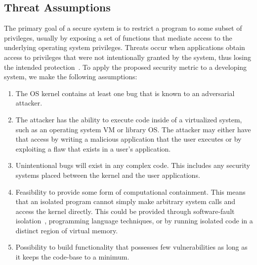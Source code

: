 
\subsection{Threat Assumptions}

The primary goal of a secure system is to restrict a program to some subset
of privileges, 
usually by exposing a set of functions that mediate access to the
underlying operating system privileges. 
Threats occur when applications obtain access to privileges that were not
intentionally granted by the system, 
thus losing the intended protection~\cite{Repy-10}. To apply the proposed security metric to a developing system, we make the following assumptions:

\begin{enumerate}
\item The OS kernel contains at least one bug that is known to an adversarial attacker.

\item The attacker has the ability to execute code inside
of a virtualized system, such as an operating system VM or library OS.
The attacker may either have that access by writing a malicious application
that the user executes or by exploiting a flaw that exists in a user's
application.

\item Unintentional bugs will exist in any complex code. This
includes any security systems placed between the kernel and the user
applications.

\item Feasibility to provide some form of computational 
containment. This means that an isolated program cannot simply
make arbitrary system calls and access the kernel directly. This could
be provided through software-fault isolation~\cite{SFI:93}, programming 
language techniques, or by running isolated code in a
distinct region of virtual memory.

\item Possibility to build functionality that possesses few
vulnerabilities as long as it keeps the code-base to a minimum.


\end{enumerate}
